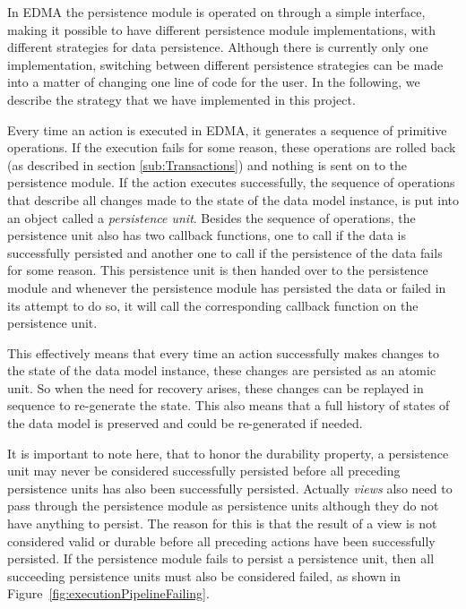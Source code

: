 In EDMA the persistence module is operated on through a simple interface,
making it possible to have different persistence module implementations,
with different strategies for data persistence. Although there is
currently only one implementation, switching between different persistence
strategies can be made into a matter of changing one line of code
for the user. In the following, we describe the strategy that we have
implemented in this project.

Every time an action is executed in EDMA, it generates a sequence
of primitive operations. If the execution fails for some reason, these
operations are rolled back (as described in section \ref{sub:Transactions})
and nothing is sent on to the persistence module. If the action executes
successfully, the sequence of operations that describe all changes
made to the state of the data model instance, is put into an object
called a \emph{persistence unit}. Besides the sequence of operations,
the persistence unit also has two callback functions, one to call
if the data is successfully persisted and another one to call if the
persistence of the data fails for some reason. This persistence unit
is then handed over to the persistence module and whenever the persistence
module has persisted the data or failed in its attempt to do so, it
will call the corresponding callback function on the persistence unit.

This effectively means that every time an action successfully makes
changes to the state of the data model instance, these changes are
persisted as an atomic unit. So when the need for recovery arises,
these changes can be replayed in sequence to re-generate the state.
This also means that a full history of states of the data model is
preserved and could be re-generated if needed.

It is important to note here, that to honor the durability property,
a persistence unit may never be considered successfully persisted
before all preceding persistence units has also been successfully
persisted. Actually \emph{views} also need to pass through the persistence
module as persistence units although they do not have anything to
persist. The reason for this is that the result of a view is not considered
valid or durable before all preceding actions have been successfully
persisted. If the persistence module fails to persist a persistence
unit, then all succeeding persistence units must also be considered
failed, as shown in Figure~\ref{fig:executionPipelineFailing}.

